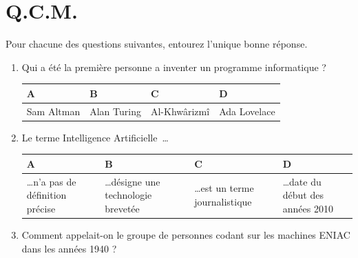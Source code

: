 \documentclass[oneside,12pt]{exam}          %
\begin{document}
\hrulefill\raisebox{-1.9pt}{\quad\decofourleft~\decosix~\decofourright \quad}\hrulefill




\section{Q.C.M.}
Pour chacune des questions suivantes, entourez l'unique bonne réponse.
\begin{enumerate}[label=\underline{Question \no\arabic*} :  , leftmargin=* , itemsep=0mm]

	\item Qui a été la première personne a inventer un programme informatique ?
	
		\hspace{\linewidth-\textwidth}
		\renewcommand{\arraystretch}{1.1}
		\begin{tabular}{| P{0.22\textwidth} | P{0.22\textwidth} | P{0.22\textwidth} | P{0.22\textwidth} |} \hline
			A & B & C & D \\ \hline
			Sam Altman & Alan Turing  & Al-Khwârizmî & Ada Lovelace \\ \hline
		\end{tabular}
	
	
	\item Le terme \og Intelligence Artificielle\fg \, \ldots
	
		\hspace{\linewidth-\textwidth}
		\renewcommand{\arraystretch}{1.1}
		\begin{tabular}{| P{0.22\textwidth} | P{0.22\textwidth} | P{0.22\textwidth} | P{0.22\textwidth} |} \hline
			A & B & C & D \\ \hline
			\ldots n’a pas de définition précise & \ldots désigne une technologie brevetée & \ldots est un terme journalistique &  \ldots date du début des années 2010\\ \hline
		\end{tabular}
	
	
	\item Comment appelait-on le groupe de personnes codant sur les machines ENIAC dans les années 1940 ?
	

\end{enumerate}
\end{document}
